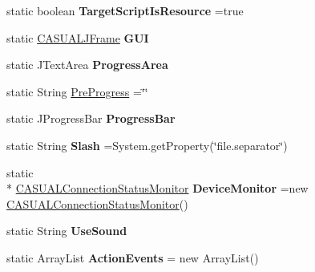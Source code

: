 \begin{DoxyCompactItemize}
\item 
\hypertarget{classCASUAL_1_1Statics_a3742b026c2af5fe83fc9852aa34ab354}{static boolean {\bfseries Target\-Script\-Is\-Resource} =true}\label{classCASUAL_1_1Statics_a3742b026c2af5fe83fc9852aa34ab354}

\item 
\hypertarget{classCASUAL_1_1Statics_af6cc8309f159db137631d47b9b5d98be}{static \hyperlink{classCASUAL_1_1CASUALJFrame}{C\-A\-S\-U\-A\-L\-J\-Frame} {\bfseries G\-U\-I}}\label{classCASUAL_1_1Statics_af6cc8309f159db137631d47b9b5d98be}

\item 
\hypertarget{classCASUAL_1_1Statics_ab563dbdeeaf28cf5c2fcce71d19b1ac6}{static J\-Text\-Area {\bfseries Progress\-Area}}\label{classCASUAL_1_1Statics_ab563dbdeeaf28cf5c2fcce71d19b1ac6}

\item 
static String \hyperlink{classCASUAL_1_1Statics_ac666581a3004f557263d08b23f72fe08}{Pre\-Progress} =\char`\"{}\char`\"{}
\item 
\hypertarget{classCASUAL_1_1Statics_aa46505d55dc8695c0ca895edc9dd0e89}{static J\-Progress\-Bar {\bfseries Progress\-Bar}}\label{classCASUAL_1_1Statics_aa46505d55dc8695c0ca895edc9dd0e89}

\item 
\hypertarget{classCASUAL_1_1Statics_abefe5091d63b2518037e758376c7e36d}{static String {\bfseries Slash} =System.\-get\-Property(\char`\"{}file.\-separator\char`\"{})}\label{classCASUAL_1_1Statics_abefe5091d63b2518037e758376c7e36d}

\item 
\hypertarget{classCASUAL_1_1Statics_a886c19004be09e7e28fcbeef1e368345}{static \\*
\hyperlink{classCASUAL_1_1CASUALConnectionStatusMonitor}{C\-A\-S\-U\-A\-L\-Connection\-Status\-Monitor} {\bfseries Device\-Monitor} =new \hyperlink{classCASUAL_1_1CASUALConnectionStatusMonitor}{C\-A\-S\-U\-A\-L\-Connection\-Status\-Monitor}()}\label{classCASUAL_1_1Statics_a886c19004be09e7e28fcbeef1e368345}

\item 
\hypertarget{classCASUAL_1_1Statics_af627784c032831e938185fbbd4e82b8f}{static String {\bfseries Use\-Sound}}\label{classCASUAL_1_1Statics_af627784c032831e938185fbbd4e82b8f}

\item 
\hypertarget{classCASUAL_1_1Statics_aaee2375029ec9a20692e40677b402979}{static Array\-List {\bfseries Action\-Events} = new Array\-List()}\label{classCASUAL_1_1Statics_aaee2375029ec9a20692e40677b402979}


\end{DoxyCompactItemize}
